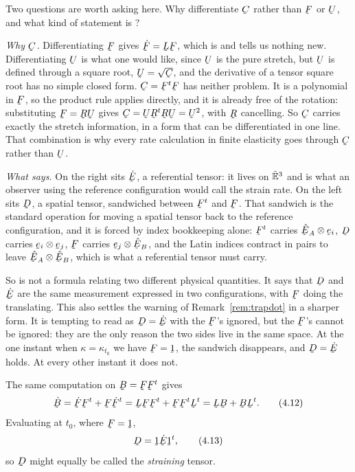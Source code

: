 \begin{remark}\label{rem:whyC}
Two questions are worth asking here. Why differentiate $\bC$ rather than
$\bF$ or $\bU$, and what kind of statement is ?

\emph{Why $\bC$.} Differentiating $\bF$ gives $\dot\bF=\bL\bF$, which is
 and tells us nothing new. Differentiating $\bU$ is what one
would like, since $\bU$ is the pure stretch, but $\bU$ is defined through
a square root, $\bU=\sqrt{\bC}$, and the derivative of a tensor square
root has no simple closed form. $\bC=\bF^{t}\bF$ has neither problem. It
is a polynomial in $\bF$, so the product rule applies directly, and it is
already free of the rotation: substituting $\bF=\bR\bU$ gives
$\bC=\bU\bR^{t}\bR\bU=\bU^{2}$, with $\bR$ cancelling. So $\bC$ carries
exactly the stretch information, in a form that can be differentiated in
one line. That combination is why every rate calculation in finite
elasticity goes through $\bC$ rather than $\bU$.

\emph{What  says.} On the right sits $\dot\bE$, a referential
tensor: it lives on $\hat{\mathbb{E}}^{3}$ and is what an observer using the reference
configuration would call the strain rate. On the left sits $\bD$,
a spatial tensor, sandwiched between $\bF^{t}$ and $\bF$. That sandwich is
the standard operation for moving a spatial tensor back to the reference
configuration, and it is forced by index bookkeeping alone:
$\bF^{t}$ carries $\hbE_{A}\otimes\be_{i}$, $\bD$ carries
$\be_{i}\otimes\be_{j}$, $\bF$ carries $\be_{j}\otimes\hbE_{B}$, and the
Latin indices contract in pairs to leave $\hbE_{A}\otimes\hbE_{B}$, which
is what a referential tensor must carry.

So  is not a formula relating two different physical quantities.
It says that $\bD$ and $\dot\bE$ are the same measurement expressed in two
configurations, with $\bF$ doing the translating. This also settles the
warning of Remark~\ref{rem:trapdot} in a sharper form. It is tempting to
read  as $\bD=\dot\bE$ with the $\bF$'s ignored, but the $\bF$'s
cannot be ignored: they are the only reason the two sides live in the same
space. At the one instant when $\kappa=\kappa_{t_{0}}$ we have
$\bF=\shift$, the sandwich disappears, and $\bD=\dot\bE$ holds. At every
other instant it does not.
\end{remark}
The same computation on $\bB=\bF\bF^{t}$ gives
\begin{equation}
   \dot\bB=\dot\bF\bF^{t}+\bF\dot\bF^{t}
   =\bL\bF\bF^{t}+\bF\bF^{t}\bL^{t}=\bL\bB+\bB\bL^{t}.
   \tag{4.12}\label{eq:4.12}
\end{equation}
Evaluating  at $t_{0}$, where $\bF=\shift$,
\begin{equation}
   \bD=\shift\dot\bE\shift^{t},
   \tag{4.13}\label{eq:4.13}
\end{equation}
so $\bD$ might equally be called the \emph{straining} tensor.

